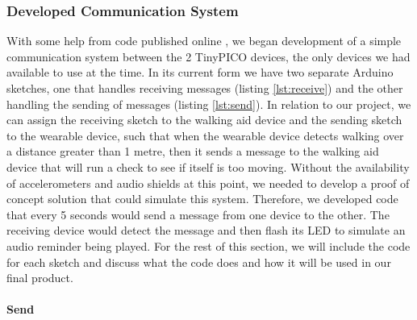 {\subsubsection{Developed Communication System}

With some help from code published online \cite{random_nerd_tutorials}, we began development of a simple communication system between the 2 TinyPICO devices, the only devices we had available to use at the time. In its current form we have two separate Arduino sketches, one that handles receiving messages (listing \ref{lst:receive}) and the other handling the sending of messages (listing \ref{lst:send}). In relation to our project, we can assign the receiving sketch to the walking aid device and the sending sketch to the wearable device, such that when the wearable device detects walking over a distance greater than 1 metre, then it sends a message to the walking aid device that will run a check to see if itself is too moving. Without the availability of accelerometers and audio shields at this point, we needed to develop a proof of concept solution that could simulate this system. Therefore, we developed code that every 5 seconds would send a message from one device to the other. The receiving device would detect the message and then flash its LED to simulate an audio reminder being played. For the rest of this section, we will include the code for each sketch and discuss what the code does and how it will be used in our final product.

\paragraph{Send}



}
